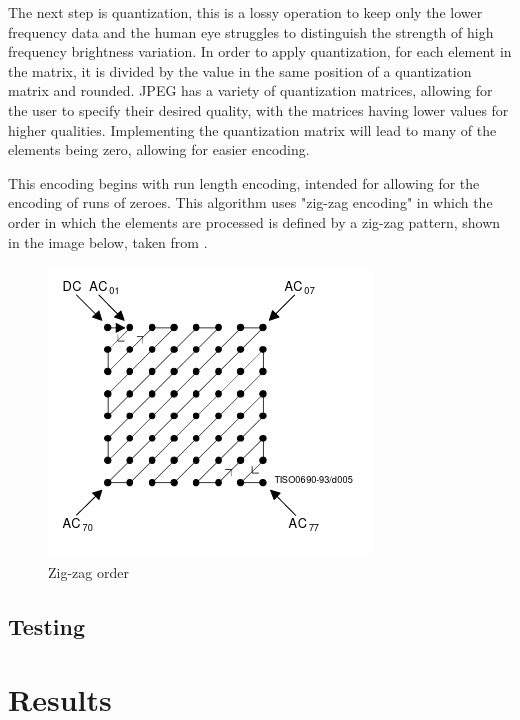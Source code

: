 \documentclass[12pt,a4paper]{article}
\begin{document}

The next step is quantization, this is a lossy operation to keep only the lower frequency data and the human eye struggles to distinguish the strength of high frequency brightness variation. In order to apply quantization, for each element in the matrix, it is divided by the value in the same position of a quantization matrix and rounded. JPEG has a variety of quantization matrices, allowing for the user to specify their desired quality, with the matrices having lower values for higher qualities. Implementing the quantization matrix will lead to many of the elements being zero, allowing for easier encoding.

This encoding begins with run length encoding, intended for allowing for the encoding of runs of zeroes. This algorithm uses "zig-zag encoding" in which the order in which the elements are processed is defined by a zig-zag pattern, shown in the image below, taken from \cite{jpeg}.

\begin{figure}[H]
    \centering
    \includegraphics{zigzag.png}
    \caption{Zig-zag order}
\end{figure}

\subsection{Testing}






\newpage
\section{Results}
\end{document}
